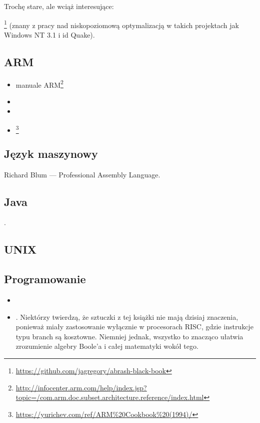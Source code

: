 Trochę stare, ale wciąż interesujące:

\MAbrash\footnote{\AlsoAvailableAs \url{https://github.com/jagregory/abrash-black-book}}
(znany z pracy nad niskopoziomową optymalizacją w takich projektach jak Windows NT 3.1 i id Quake).

\subsection{ARM}

\begin{itemize}
\item manuale ARM\footnote{\AlsoAvailableAs \url{http://infocenter.arm.com/help/index.jsp?topic=/com.arm.doc.subset.architecture.reference/index.html}}

\item \ARMSevenRef

\item \ARMSixFourRefURL

\item \ARMCookBook\footnote{\AlsoAvailableAs \url{https://yurichev.com/ref/ARM%20Cookbook%20(1994)/}}
\end{itemize}

\subsection{Język maszynowy}

Richard Blum --- Professional Assembly Language.

\subsection{Java}

\JavaBook.

\subsection{UNIX}

\TAOUP

\subsection{Programowanie}

\begin{itemize}

\item \RobPikePractice

\item \HenryWarren.
Niektórzy twierdzą, że sztuczki z tej książki nie mają dzisiaj znaczenia, ponieważ miały zastosowanie wyłącznie w procesorach \ac{RISC},
gdzie instrukcje typu branch są kosztowne.
Niemniej jednak, wszystko to znacząco ułatwia zrozumienie algebry Boole'a i całej matematyki wokół tego.

\end{itemize}



